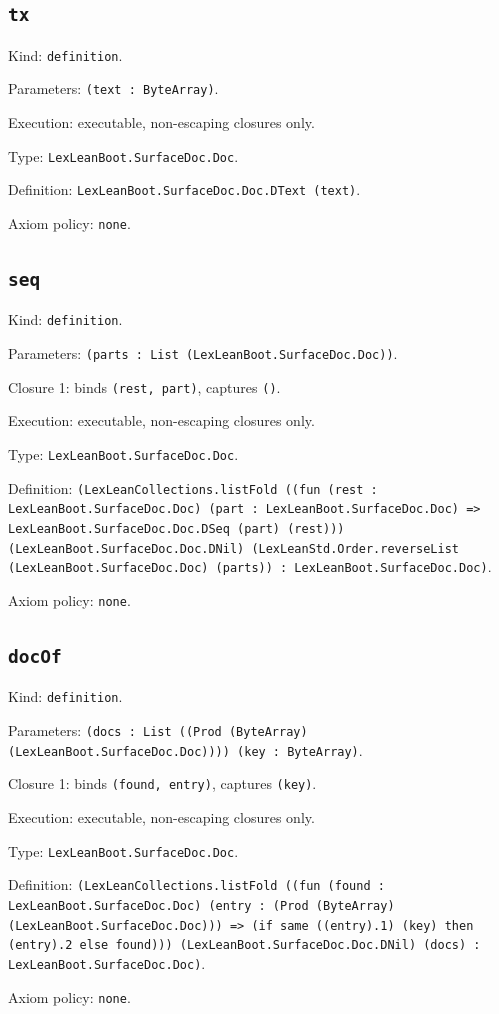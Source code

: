 \documentclass[11pt]{article}
\begin{document}
\subsection*{\texttt{tx}}
\noindent Kind: \texttt{definition}.\par
\noindent Parameters: \texttt{(text : ByteArray)}.\par
\noindent Execution: executable, non-escaping closures only.\par
\noindent Type: \texttt{LexLeanBoot.SurfaceDoc.Doc}.\par
\noindent Definition: \texttt{LexLeanBoot.SurfaceDoc.Doc.DText (text)}.\par
\noindent Axiom policy: \texttt{none}.\par
\subsection*{\texttt{seq}}
\noindent Kind: \texttt{definition}.\par
\noindent Parameters: \texttt{(parts : List (LexLeanBoot.SurfaceDoc.Doc))}.\par
\noindent Closure 1: binds \texttt{(rest, part)}, captures \texttt{()}.\par
\noindent Execution: executable, non-escaping closures only.\par
\noindent Type: \texttt{LexLeanBoot.SurfaceDoc.Doc}.\par
\noindent Definition: \texttt{(LexLeanCollections.listFold ((fun (rest : LexLeanBoot.SurfaceDoc.Doc) (part : LexLeanBoot.SurfaceDoc.Doc) => LexLeanBoot.SurfaceDoc.Doc.DSeq (part) (rest))) (LexLeanBoot.SurfaceDoc.Doc.DNil) (LexLeanStd.Order.reverseList (LexLeanBoot.SurfaceDoc.Doc) (parts)) : LexLeanBoot.SurfaceDoc.Doc)}.\par
\noindent Axiom policy: \texttt{none}.\par
\subsection*{\texttt{docOf}}
\noindent Kind: \texttt{definition}.\par
\noindent Parameters: \texttt{(docs : List ((Prod (ByteArray) (LexLeanBoot.SurfaceDoc.Doc)))) (key : ByteArray)}.\par
\noindent Closure 1: binds \texttt{(found, entry)}, captures \texttt{(key)}.\par
\noindent Execution: executable, non-escaping closures only.\par
\noindent Type: \texttt{LexLeanBoot.SurfaceDoc.Doc}.\par
\noindent Definition: \texttt{(LexLeanCollections.listFold ((fun (found : LexLeanBoot.SurfaceDoc.Doc) (entry : (Prod (ByteArray) (LexLeanBoot.SurfaceDoc.Doc))) => (if same ((entry).1) (key) then (entry).2 else found))) (LexLeanBoot.SurfaceDoc.Doc.DNil) (docs) : LexLeanBoot.SurfaceDoc.Doc)}.\par
\noindent Axiom policy: \texttt{none}.\par
\end{document}
